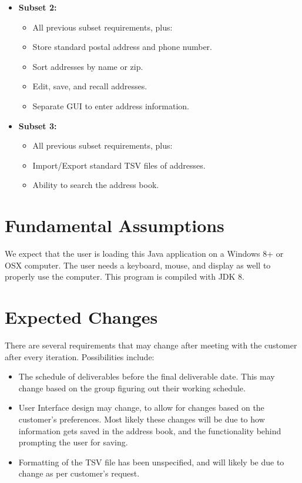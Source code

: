 \documentclass[a4paper, 11pt]{article}
\begin{document}
\begin{itemize}
	\item \textbf{Subset 2:}
	\begin{itemize}
		\item All previous subset requirements, plus:
		\item Store standard postal address and phone number.
		\item Sort addresses by name or zip.
		\item Edit, save, and recall addresses.
		\item Separate GUI to enter address information.
	\end{itemize}
\end{itemize}

\begin{itemize}
	\item \textbf{Subset 3:}
	\begin{itemize}
		\item All previous subset requirements, plus:
		\item Import/Export standard TSV files of addresses.
		\item Ability to search the address book.
	\end{itemize}
\end{itemize}

\section{Fundamental Assumptions}
We expect that the user is loading this Java application on a Windows 8+ or OSX computer. The user needs a keyboard, mouse, and display as well to properly use the computer. This program is compiled with JDK 8. 

\section{Expected Changes}
There are several requirements that may change after meeting with the customer after every iteration. Possibilities include: 
\begin{itemize}
	\item The schedule of deliverables before the final deliverable date. This may change based on the group figuring out their working schedule.
	\item User Interface design may change, to allow for changes based on the customer's preferences. Most likely these changes will be due to how information gets saved in the address book, and the functionality behind prompting the user for saving.
	\item Formatting of the TSV file has been unspecified, and will likely be due to change as per customer's request.
\end{itemize}
\end{document}
